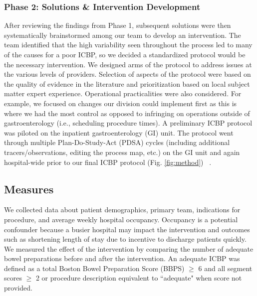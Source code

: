 \documentclass[Bprep]{subfiles}
\begin{document}
\subsubsection{Phase 2: Solutions \& Intervention Development}\label{subsec:IntPhase2}

After reviewing the findings from Phase 1, subsequent solutions were then systematically brainstormed among our team to develop an intervention. The team identified that the high variability seen throughout the process led to many of the causes for a poor ICBP, so we decided a standardized protocol would be the necessary intervention. We designed arms of the protocol to address issues at the various levels of providers. Selection of aspects of
the protocol were based on the quality of evidence in the literature and prioritization based on local subject matter expert experience. Operational practicalities were also considered. For example, we focused on changes our division could implement first as this is where we had the most control as opposed to infringing on operations outside of gastroenterology (i.e., scheduling procedure times). A preliminary ICBP protocol was piloted on the inpatient gastroenterology (GI) unit. The protocol went through multiple Plan-Do-Study-Act (PDSA) cycles (including additional tracers/observations, editing the process map, etc.) on the GI unit and again hospital-wide prior to our final ICBP protocol (Fig. \ref{fig:method}) ~\cite{Langley2009-al}.\\

\subsection{Measures}\label{subsec:Measures}
\hypertarget{Measures}{}

We collected data about patient demographics, primary team, indications for procedure, and average weekly hospital occupancy. Occupancy is a potential confounder because a busier hospital may impact the intervention and outcomes such as shortening length of stay due to incentive to discharge patients quickly. We measured the effect of the intervention by comparing the number of adequate bowel preparations before and after the intervention. An adequate ICBP was defined as a total Boston Bowel Preparation Score (BBPS) $\geq$ 6 and all segment scores $\geq$ 2 or procedure description equivalent to ``adequate" when score not provided.\\
\end{document}
